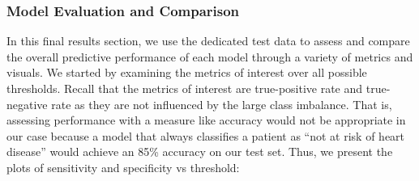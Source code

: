 \documentclass[10pt]{article}
\begin{document}
\subsubsection*{Model Evaluation and Comparison}

In this final results section, we use the dedicated test data to assess and compare the overall predictive performance of each model through a variety of metrics and visuals. We started by examining the metrics of interest over all possible thresholds. Recall that the metrics of interest are true-positive rate and true-negative rate as they are not influenced by the large class imbalance. That is, assessing performance with a measure like accuracy would not be appropriate in our case because a model that always classifies a patient as “not at risk of heart disease” would achieve an 85\% accuracy on our test set. Thus, we present the plots of sensitivity and specificity vs threshold:

\begin{figure}[hbt!]
\hspace*{\fill}
\centering
{}\hspace{0em}
\hspace*{\fill}
\end{figure}
\end{document}
